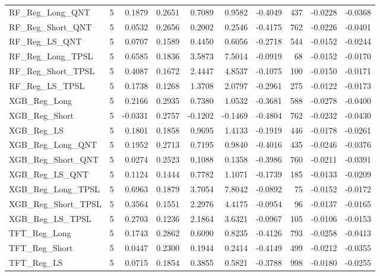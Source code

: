 \begin{tabular}{llrrrrrrrr}
\cline{1-10}
RF\_Reg\_Long\_QNT & 5 & 0.1879 & 0.2651 & 0.7089 & 0.9582 & -0.4049 & 437 & -0.0228 & -0.0368 \\
\cline{1-10}
RF\_Reg\_Short\_QNT & 5 & 0.0532 & 0.2656 & 0.2002 & 0.2546 & -0.4175 & 762 & -0.0226 & -0.0401 \\
\cline{1-10}
RF\_Reg\_LS\_QNT & 5 & 0.0707 & 0.1589 & 0.4450 & 0.6056 & -0.2718 & 544 & -0.0152 & -0.0244 \\
\cline{1-10}
RF\_Reg\_Long\_TPSL & 5 & 0.6585 & 0.1836 & 3.5873 & 7.5014 & -0.0919 & 68 & -0.0152 & -0.0170 \\
\cline{1-10}
RF\_Reg\_Short\_TPSL & 5 & 0.4087 & 0.1672 & 2.4447 & 4.8537 & -0.1075 & 100 & -0.0150 & -0.0171 \\
\cline{1-10}
RF\_Reg\_LS\_TPSL & 5 & 0.1738 & 0.1268 & 1.3708 & 2.0797 & -0.2961 & 275 & -0.0122 & -0.0173 \\
\cline{1-10}
XGB\_Reg\_Long & 5 & 0.2166 & 0.2935 & 0.7380 & 1.0532 & -0.3681 & 588 & -0.0278 & -0.0400 \\
\cline{1-10}
XGB\_Reg\_Short & 5 & -0.0331 & 0.2757 & -0.1202 & -0.1469 & -0.4804 & 762 & -0.0232 & -0.0430 \\
\cline{1-10}
XGB\_Reg\_LS & 5 & 0.1801 & 0.1858 & 0.9695 & 1.4133 & -0.1919 & 446 & -0.0178 & -0.0261 \\
\cline{1-10}
XGB\_Reg\_Long\_QNT & 5 & 0.1952 & 0.2713 & 0.7195 & 0.9840 & -0.4016 & 435 & -0.0246 & -0.0376 \\
\cline{1-10}
XGB\_Reg\_Short\_QNT & 5 & 0.0274 & 0.2523 & 0.1088 & 0.1358 & -0.3986 & 760 & -0.0211 & -0.0391 \\
\cline{1-10}
XGB\_Reg\_LS\_QNT & 5 & 0.1124 & 0.1444 & 0.7782 & 1.1071 & -0.1739 & 185 & -0.0133 & -0.0209 \\
\cline{1-10}
XGB\_Reg\_Long\_TPSL & 5 & 0.6963 & 0.1879 & 3.7054 & 7.8042 & -0.0892 & 75 & -0.0152 & -0.0172 \\
\cline{1-10}
XGB\_Reg\_Short\_TPSL & 5 & 0.3564 & 0.1551 & 2.2976 & 4.4175 & -0.0954 & 96 & -0.0137 & -0.0165 \\
\cline{1-10}
XGB\_Reg\_LS\_TPSL & 5 & 0.2703 & 0.1236 & 2.1864 & 3.6321 & -0.0967 & 105 & -0.0106 & -0.0153 \\
\cline{1-10}
TFT\_Reg\_Long & 5 & 0.1743 & 0.2862 & 0.6090 & 0.8235 & -0.4126 & 793 & -0.0258 & -0.0413 \\
\cline{1-10}
TFT\_Reg\_Short & 5 & 0.0447 & 0.2300 & 0.1944 & 0.2414 & -0.4149 & 499 & -0.0212 & -0.0355 \\
\cline{1-10}
TFT\_Reg\_LS & 5 & 0.0715 & 0.1854 & 0.3855 & 0.5821 & -0.3788 & 998 & -0.0180 & -0.0255 \\

\end{tabular}
